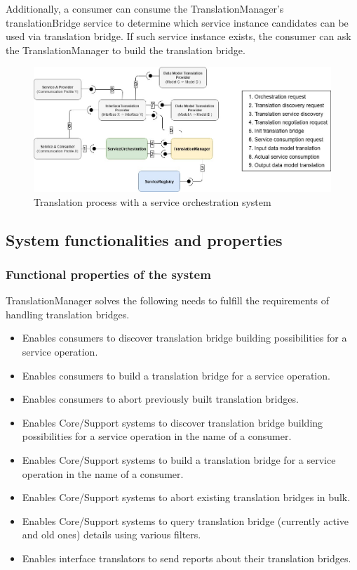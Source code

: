 \documentclass[a4paper]{arrowhead}
\begin{document}
Additionally, a consumer can consume the TranslationManager's translationBridge service to determine which service instance candidates can be used via translation bridge. If such service instance exists, the consumer can ask the TranslationManager to build the translation bridge.

\begin{figure}[ht!]
  \centering
  \includegraphics[width=\textwidth]{figures/TranslatorManagerv5.jpg}
  \caption{Translation process with a service orchestration system}
  \label{fig:translation_process}
\end{figure}

\subsection{System functionalities and properties}
\label{sec:properties}

\subsubsection {Functional properties of the system}
TranslationManager solves the following needs to fulfill the requirements of handling translation bridges.

\begin{itemize}
    \item Enables consumers to discover translation bridge building possibilities for a service operation.
    \item Enables consumers to build a translation bridge for a service operation.
    \item Enables consumers to abort previously built translation bridges.
    \item Enables Core/Support systems to discover translation bridge building possibilities for a service operation in the name of a consumer.
    \item Enables Core/Support systems to build a translation bridge for a service operation in the name of a consumer.
    \item Enables Core/Support systems to abort existing translation bridges in bulk.
    \item Enables Core/Support systems to query translation bridge (currently active and old ones) details using various filters.
    \item Enables interface translators to send reports about their translation bridges.
\end{itemize}
\end{document}
